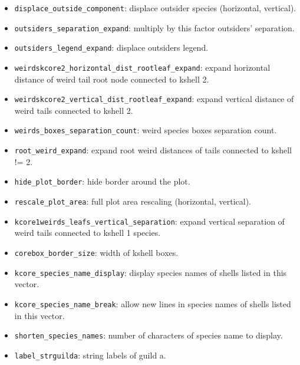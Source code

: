 \documentclass[12pt]{article}
\begin{document}
\begin{itemize}
\item \texttt{displace\_outside\_component}: displace outsider species (horizontal, vertical).

\item \texttt{outsiders\_separation\_expand}: multiply by this factor outsiders' separation.

\item \texttt{outsiders\_legend\_expand}: displace outsiders legend.

\item \texttt{weirdskcore2\_horizontal\_dist\_rootleaf\_expand}: expand horizontal distance of weird tail root node connected to kshell 2.

\item \texttt{weirdskcore2\_vertical\_dist\_rootleaf\_expand}: expand vertical distance of weird tails connected to kshell 2.

\item \texttt{weirds\_boxes\_separation\_count}: weird species boxes separation count.

\item \texttt{root\_weird\_expand}: expand root weird distances of tails connected to kshell != 2.

\item \texttt{hide\_plot\_border}: hide border around the plot.

\item \texttt{rescale\_plot\_area}: full plot area rescaling (horizontal, vertical).

\item \texttt{kcore1weirds\_leafs\_vertical\_separation}: expand vertical separation of weird tails connected to kshell 1 species.

\item \texttt{corebox\_border\_size}: width of kshell boxes.

\item \texttt{kcore\_species\_name\_display}: display species names of shells listed in this vector.

\item \texttt{kcore\_species\_name\_break}: allow new lines in species names of shells listed in this vector.

\item \texttt{shorten\_species\_names}: number of characters of species name to display.

\item \texttt{label\_strguilda}: string labels of guild a.


\end{itemize}
\end{document}
